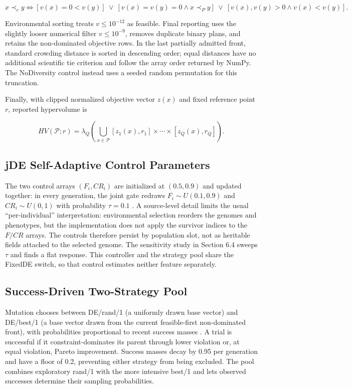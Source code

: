 \documentclass[energies,article,submit,moreauthors]{Definitions/mdpi}
\begin{document}
\[
x\prec_c y\iff
[v(x)=0<v(y)]\ \lor\
[v(x)=v(y)=0\land x\prec_P y]\ \lor\
[v(x),v(y)>0\land v(x)<v(y)].
\]

Environmental sorting treats \(v\leq10^{-12}\) as feasible. Final reporting uses the slightly looser numerical filter \(v\leq10^{-9}\), removes duplicate binary plans, and retains the non-dominated objective rows. In the last partially admitted front, standard crowding distance is sorted in descending order; equal distances have no additional scientific tie criterion and follow the array order returned by NumPy. The NoDiversity control instead uses a seeded random permutation for this truncation.

Finally, with clipped normalized objective vector \(z(x)\) and fixed reference point \(r\), reported hypervolume is

\[
HV(\mathcal P;r)=\lambda_Q\!\left(\bigcup_{x\in\mathcal P}
[z_1(x),r_1]\times\cdots\times[z_Q(x),r_Q]\right).
\]

\subsection{jDE Self-Adaptive Control Parameters}\label{jde-self-adaptive-control-parameters}

The two control arrays \((F_i,CR_i)\) are initialized at \((0.5,0.9)\) and updated together: in every generation, the joint gate redraws \(F_i\sim U(0.1,0.9)\) and \(CR_i\sim U(0,1)\) with probability \(\tau=0.1\) \cite{ref2}. A source-level detail limits the usual ``per-individual'' interpretation: environmental selection reorders the genomes and phenotypes, but the implementation does not apply the survivor indices to the \(F/CR\) arrays. The controls therefore persist by population slot, not as heritable fields attached to the selected genome. The sensitivity study in Section 6.4 sweeps \(\tau\) and finds a flat response. This controller and the strategy pool share the FixedDE switch, so that control estimates neither feature separately.

\subsection{Success-Driven Two-Strategy Pool}\label{success-driven-two-strategy-pool}

Mutation chooses between DE/rand/1 (a uniformly drawn base vector) and DE/best/1 (a base vector drawn from the current feasible-first non-dominated front), with probabilities proportional to recent success masses \cite{ref3}. A trial is successful if it constraint-dominates its parent through lower violation or, at equal violation, Pareto improvement. Success masses decay by 0.95 per generation and have a floor of 0.2, preventing either strategy from being excluded. The pool combines exploratory rand/1 with the more intensive best/1 and lets observed successes determine their sampling probabilities.
\end{document}
